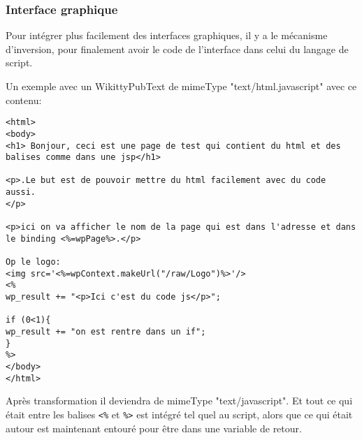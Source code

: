 


\subsubsection*{Interface graphique}

Pour intégrer plus facilement des interfaces graphiques, il y a le mécanisme 
d'inversion, pour finalement avoir le code de l'interface dans celui du langage
de script.

Un exemple avec un WikittyPubText de mimeType "text/html.javascript" avec ce contenu:

\begin{lstlisting}
<html>
<body>
<h1> Bonjour, ceci est une page de test qui contient du html et des balises comme dans une jsp</h1>

<p>.Le but est de pouvoir mettre du html facilement avec du code aussi.
</p>

<p>ici on va afficher le nom de la page qui est dans l'adresse et dans le binding <%=wpPage%>.</p>

Op le logo:
<img src='<%=wpContext.makeUrl("/raw/Logo")%>'/>
<%
wp_result += "<p>Ici c'est du code js</p>";

if (0<1){
wp_result += "on est rentre dans un if";
}
%>
</body>
</html>
\end{lstlisting}
Après transformation il deviendra de mimeType "text/javascript". Et tout ce qui
était entre les balises \verb!<%! et \verb!%>! est intégré tel quel au script, alors
que ce qui était autour est maintenant entouré pour être dans une variable de retour.\\

